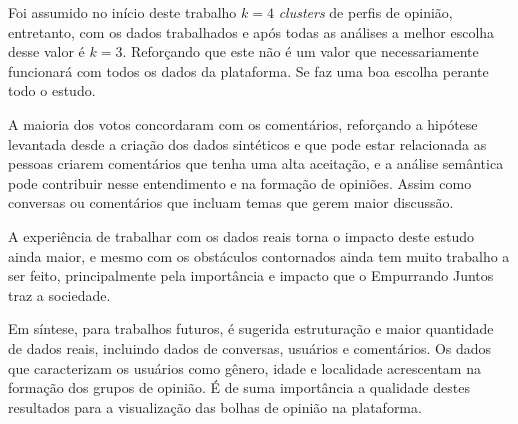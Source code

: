 Foi assumido no início deste trabalho $k=4$ \textit{clusters} de perfis de opinião, entretanto, com os dados trabalhados e após todas as análises a melhor escolha desse valor é $k=3$. Reforçando que este não é um valor que necessariamente funcionará com todos os dados da plataforma. Se faz uma boa escolha perante todo o estudo.


A maioria dos votos concordaram com os comentários, reforçando a hipótese levantada desde a criação dos dados sintéticos e que pode estar relacionada as pessoas criarem comentários que tenha uma alta aceitação, e a análise semântica pode contribuir nesse entendimento e na formação de opiniões. Assim como conversas ou comentários que incluam temas que gerem maior discussão.







A experiência de trabalhar com os dados reais torna o impacto deste estudo ainda maior, e mesmo com os obstáculos contornados ainda tem muito trabalho a ser feito, principalmente pela importância e impacto que o Empurrando Juntos traz a sociedade.


Em síntese, para trabalhos futuros, é sugerida estruturação e maior quantidade de dados reais, incluindo dados de conversas, usuários e comentários. Os dados que caracterizam os usuários como gênero, idade e localidade acrescentam na formação dos grupos de opinião. É de suma importância a qualidade destes resultados para a visualização das bolhas de opinião na plataforma.

 




